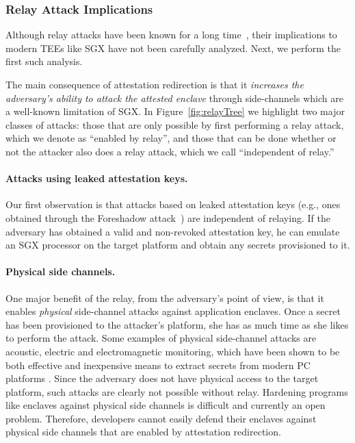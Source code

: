 \subsubsection*{Relay Attack Implications}            

Although relay attacks have been known for a long time~\cite{parno2008bootstrapping}, their implications to modern TEEs like SGX have not been carefully analyzed. Next, we perform the first such analysis.

The main consequence of attestation redirection is that it \emph{increases the adversary's ability to attack the attested enclave} through side-channels which are a well-known limitation of SGX. In Figure~\ref{fig:relayTree} we highlight two major classes of attacks: those that are only possible by first performing a relay attack, which we denote as ``enabled by relay'', and those that can be done whether or not the attacker also does a relay attack, which we call ``independent of relay.''


\paragraph{Attacks using leaked attestation keys.}
Our first observation is that attacks based on leaked attestation keys (e.g., ones obtained through the Foreshadow attack~\cite{foreshadow-usenix18}) are independent of relaying. If the adversary has obtained a valid and non-revoked attestation key, he can emulate an SGX processor on the target platform and obtain any secrets provisioned to it. %


\paragraph{Physical side channels.}
One major benefit of the relay, from the adversary's point of view, is that it enables \emph{physical} side-channel attacks against application enclaves. Once a secret has been provisioned to the attacker's platform, she has as much time as she likes to perform the attack. Some examples of physical side-channel attacks are acoustic, electric and electromagnetic monitoring, which have been shown to be both effective and inexpensive means to extract secrets from modern PC platforms . Since the adversary does not have physical access to the target platform, such attacks are clearly not possible without relay. Hardening programs like enclaves against physical side channels is difficult and currently an open problem. Therefore, developers cannot easily defend their enclaves against physical side channels that are enabled by attestation redirection.


